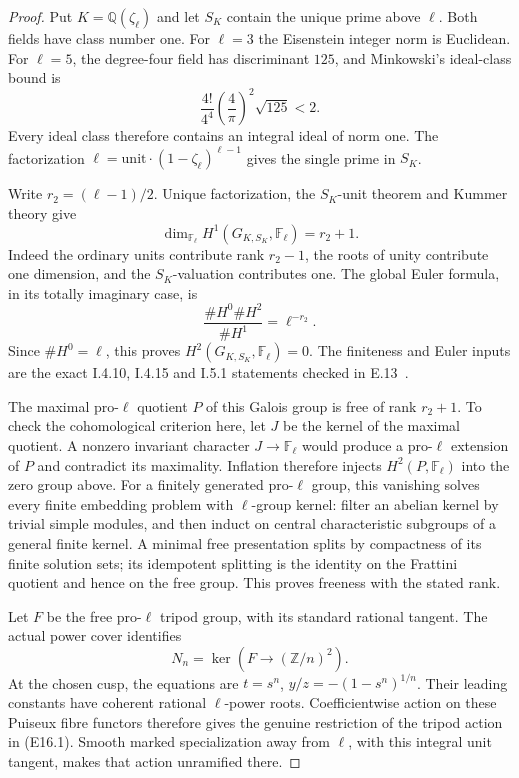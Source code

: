 \documentclass[11pt,oneside]{article}
\begin{document}
\begin{proof}
Put $K=\mathbb Q(\zeta_\ell)$ and let $S_K$ contain
the unique prime above $\ell$. Both fields have
class number one. For $\ell=3$ the Eisenstein
integer norm is Euclidean. For $\ell=5$, the
degree-four field has discriminant $125$, and
Minkowski's ideal-class bound is
\[
 \frac{4!}{4^4}\left(\frac4\pi\right)^2\sqrt{125}<2.
\]
Every ideal class therefore contains an integral
ideal of norm one. The factorization
$\ell=\text{unit}\cdot(1-\zeta_\ell)^{\ell-1}$
gives the single prime in $S_K$.

Write $r_2=(\ell-1)/2$. Unique factorization,
the $S_K$-unit theorem and Kummer theory give
\[
 \dim_{\mathbb F_\ell}
 H^1(G_{K,S_K},\mathbb F_\ell)=r_2+1 .
\]
Indeed the ordinary units contribute rank $r_2-1$,
the roots of unity contribute one dimension, and
the $S_K$-valuation contributes one. The global
Euler formula, in its totally imaginary case, is
\[
 \frac{\#H^0\#H^2}{\#H^1}=\ell^{-r_2}.
\]
Since $\#H^0=\ell$, this proves
$H^2(G_{K,S_K},\mathbb F_\ell)=0$.
The finiteness and Euler inputs are the exact
I.4.10, I.4.15 and I.5.1 statements checked in
E.13~\cite{E_density_MilneADT}.

The maximal pro-$\ell$ quotient $P$ of this Galois
group is free of rank $r_2+1$. To check the
cohomological criterion here, let $J$ be the kernel
of the maximal quotient. A nonzero invariant
character $J\to\mathbb F_\ell$ would produce a
pro-$\ell$ extension of $P$ and contradict its
maximality. Inflation therefore injects
$H^2(P,\mathbb F_\ell)$ into the zero group above.
For a finitely generated pro-$\ell$ group, this
vanishing solves every finite embedding problem
with $\ell$-group kernel: filter an abelian kernel
by trivial simple modules, and then induct on
central characteristic subgroups of a general
finite kernel. A minimal free presentation splits
by compactness of its finite solution sets; its
idempotent splitting is the identity on the
Frattini quotient and hence on the free group.
This proves freeness with the stated rank.

Let $F$ be the free pro-$\ell$ tripod group, with
its standard rational tangent. The actual power
cover identifies
\[
 N_n=\ker(F\longrightarrow(\mathbb Z/n)^2).
 \tag{E16.1}
\]
At the chosen cusp, the equations are
$t=s^n$, $y/z=-(1-s^n)^{1/n}$.
Their leading constants have coherent rational
$\ell$-power roots. Coefficientwise action on
these Puiseux fibre functors therefore gives
the genuine restriction of the tripod action
in (E16.1). Smooth marked specialization away
from $\ell$, with this integral unit tangent,
makes that action unramified there.


\end{proof}
\end{document}
